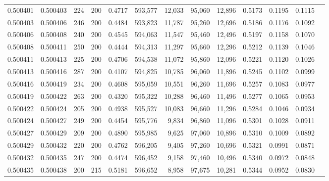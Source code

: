 \begin{tabular}{rrrrrrrrrrrrr}
0.500401 & 0.500403 &    224 & 200 &                                     0.4717 & 593,577 &  12,033 &  95,060 &  12,896 & 0.5173 & 0.1195 & 0.1115 \\
0.500403 & 0.500406 &    246 & 200 &                                     0.4484 & 593,823 &  11,787 &  95,260 &  12,696 & 0.5186 & 0.1176 & 0.1092 \\
0.500406 & 0.500408 &    240 & 200 &                                     0.4545 & 594,063 &  11,547 &  95,460 &  12,496 & 0.5197 & 0.1158 & 0.1070 \\
0.500408 & 0.500411 &    250 & 200 &                                     0.4444 & 594,313 &  11,297 &  95,660 &  12,296 & 0.5212 & 0.1139 & 0.1046 \\
0.500411 & 0.500413 &    225 & 200 &                                     0.4706 & 594,538 &  11,072 &  95,860 &  12,096 & 0.5221 & 0.1120 & 0.1026 \\
0.500413 & 0.500416 &    287 & 200 &                                     0.4107 & 594,825 &  10,785 &  96,060 &  11,896 & 0.5245 & 0.1102 & 0.0999 \\
0.500416 & 0.500419 &    234 & 200 &                                     0.4608 & 595,059 &  10,551 &  96,260 &  11,696 & 0.5257 & 0.1083 & 0.0977 \\
0.500419 & 0.500422 &    263 & 200 &                                     0.4320 & 595,322 &  10,288 &  96,460 &  11,496 & 0.5277 & 0.1065 & 0.0953 \\
0.500422 & 0.500424 &    205 & 200 &                                     0.4938 & 595,527 &  10,083 &  96,660 &  11,296 & 0.5284 & 0.1046 & 0.0934 \\
0.500424 & 0.500427 &    249 & 200 &                                     0.4454 & 595,776 &   9,834 &  96,860 &  11,096 & 0.5301 & 0.1028 & 0.0911 \\
0.500427 & 0.500429 &    209 & 200 &                                     0.4890 & 595,985 &   9,625 &  97,060 &  10,896 & 0.5310 & 0.1009 & 0.0892 \\
0.500429 & 0.500432 &    220 & 200 &                                     0.4762 & 596,205 &   9,405 &  97,260 &  10,696 & 0.5321 & 0.0991 & 0.0871 \\
0.500432 & 0.500435 &    247 & 200 &                                     0.4474 & 596,452 &   9,158 &  97,460 &  10,496 & 0.5340 & 0.0972 & 0.0848 \\
0.500435 & 0.500438 &    200 & 215 &                                     0.5181 & 596,652 &   8,958 &  97,675 &  10,281 & 0.5344 & 0.0952 & 0.0830 \\

\end{tabular}
